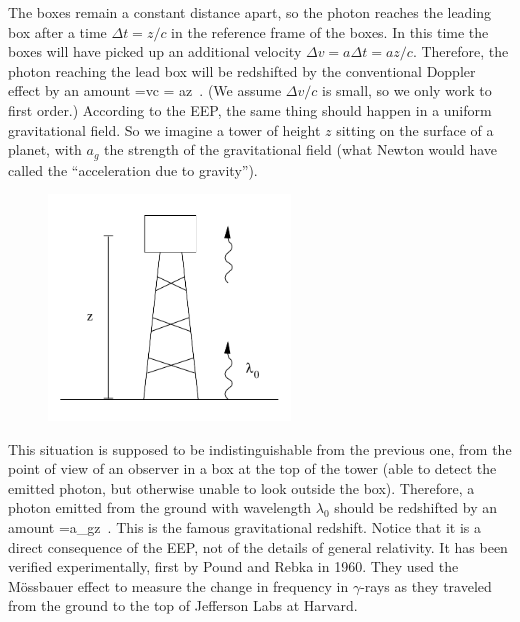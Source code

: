\documentclass[12pt]{article}
\begin{document}
The boxes remain a constant distance apart, so the photon reaches
the leading box after a time $\Delta t = z/c$ in the reference frame
of the boxes.  In this time the boxes will have picked up an additional
velocity $\Delta v = a\Delta t = az/c$.  Therefore, the photon reaching 
the lead box will be redshifted by the conventional Doppler effect by
an amount
\be
  {{\Delta \lambda}}={{\Delta v}\over c} =
  {{az}}\ .\label{4.5}
\ee
(We assume $\Delta v/c$ is small, so we only work to first order.)
According to the EEP, the same thing should happen in a uniform
gravitational field.  So we imagine a tower of height $z$ sitting
on the surface of a planet, with $a_g$ the strength of the gravitational
field (what Newton would have called the ``acceleration due to gravity'').

\begin{figure}[h]
  \centerline{
  \includegraphics[height=6cm]{pdf/four5}}
\end{figure}

\noindent This situation is supposed to be indistinguishable from the 
previous one, from the point of view of an observer in a box at the top of 
the tower (able to detect the emitted photon, but otherwise unable
to look outside the box).  Therefore, a photon emitted from the
ground with wavelength $\lambda_0$ should be redshifted by an amount
\be
  {{\Delta \lambda}}={{a_gz}}\ .\label{4.6}
\ee
This is the famous gravitational redshift.  Notice that it is a
direct consequence of the EEP, not of the details of general 
relativity.  It has been verified experimentally, first by Pound
and Rebka in 1960.  They used the M\"ossbauer effect to measure the
change in frequency in $\gamma$-rays as they traveled from the ground to
the top of Jefferson Labs at Harvard.
\end{document}
